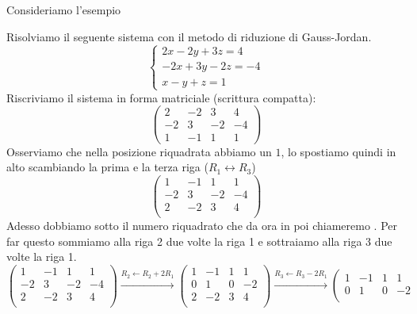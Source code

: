 \documentclass{article}     %
\begin{document}
Consideriamo l'esempio 
\begin{ex}
    Risolviamo il seguente sistema con il metodo di riduzione di Gauss-Jordan.
    \[\begin{cases} 
        2x -2y+3z=4 \\
        -2x + 3y - 2z = -4\\
        x -y+z=1
     \end{cases} \]
     Riscriviamo il sistema in forma matriciale (scrittura compatta):
     \[\left(\begin{array}{ccc|c} 2 & - 2 & 3& 4\\- 2 & 3 & - 2 & - 4 \\ \boxed{1} & - 1 & 1 & 1 \end{array}\right) \]
     Osserviamo che nella posizione riquadrata abbiamo un $1$, lo spostiamo quindi in alto scambiando la prima e la terza riga ($R_1\leftrightarrow R_3$)
     \[\left(\begin{array}{ccc|c} 
        \boxed{1} & - 1 & 1 & 1 \\
        - 2 & 3 & - 2 & - 4 \\
        2 & - 2 & 3& 4\\
    \end{array}\right) \]
    Adesso dobbiamo  sotto il numero riquadrato che da ora in poi chiameremo . Per far questo sommiamo alla riga 2 due volte la riga 1 e sottraiamo alla riga 3 due volte la riga 1.
    \[\left(\begin{array}{ccc|c} 
        \boxed{1} & - 1 & 1 & 1 \\
        - 2 & 3 & - 2 & - 4 \\
        2 & - 2 & 3& 4\\
    \end{array}\right)
    \overset{R_2\leftarrow R_2 + 2R_1}{\xrightarrow{\hspace{2cm}}}
    \left(\begin{array}{ccc|c} 
        \boxed{1} & - 1 & 1 & 1 \\
        0 & \boxed{1} & 0 & - 2 \\
        2 & - 2 & 3& 4\\
    \end{array}\right)
    \overset{R_3\leftarrow R_3 - 2R_1}{\xrightarrow{\hspace{2cm}}}
    \left(\begin{array}{ccc|c} 
        \boxed{1} & - 1 & 1 & 1 \\
        0 & \boxed{1} & 0 & - 2 \\

\end{array}\]
\end{ex}
\end{document}
